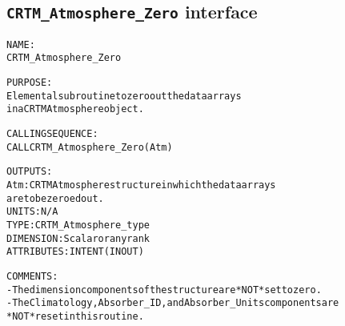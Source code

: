 \subsection{\texttt{CRTM\_Atmosphere\_Zero} interface}
  \label{sec:CRTM_Atmosphere_Zero_interface}
  \begin{alltt}
 
  NAME:
        CRTM_Atmosphere_Zero
  
  PURPOSE:
        Elemental subroutine to zero out the data arrays
        in a CRTM Atmosphere object.
 
  CALLING SEQUENCE:
        CALL CRTM_Atmosphere_Zero( Atm )
 
  OUTPUTS:
        Atm:          CRTM Atmosphere structure in which the data arrays
                      are to be zeroed out.
                      UNITS:      N/A
                      TYPE:       CRTM_Atmosphere_type
                      DIMENSION:  Scalar or any rank
                      ATTRIBUTES: INTENT(IN OUT)
 
  COMMENTS:
        - The dimension components of the structure are *NOT* set to zero.
        - The Climatology, Absorber_ID, and Absorber_Units components are
          *NOT* reset in this routine.
 
  \end{alltt}
